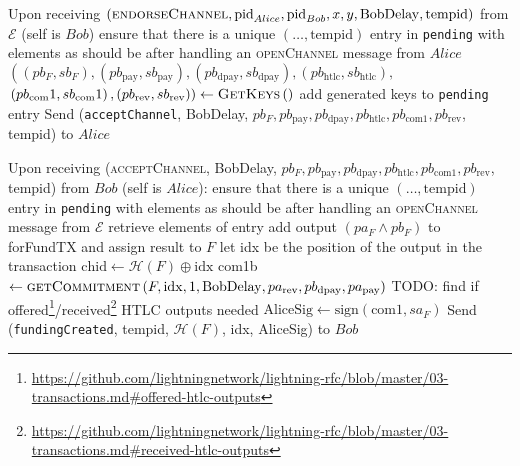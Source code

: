 \begin{algorithmic}[1]
    \State Upon receiving $\left(\textsc{endorseChannel}, \mathrm{pid}_{Alice},
    \mathrm{pid}_{Bob}, x, y, \mathrm{BobDelay}, \mathrm{tempid}\right)$ from
    $\mathcal{E}$ (self is $Bob$)
    \Indent
      \State ensure that there is a unique $\left(\dots, \mathrm{tempid}\right)$
      entry in \texttt{pending} with elements as should be after handling an
      \textsc{openChannel} message from $Alice$
      \State $\left(\left(pb_F, sb_F\right), \left(pb_\mathrm{pay},
      sb_\mathrm{pay}\right), \left(pb_\mathrm{dpay}, sb_\mathrm{dpay}\right),
      \left(pb_\mathrm{htlc}, sb_\mathrm{htlc}\right),\right.$
      \State $\left.\left(pb_\mathrm{com}1, sb_\mathrm{com}1\right),
      \left(pb_\mathrm{rev}, sb_\mathrm{rev}\right)\right) \gets
      \textsc{GetKeys}\left(\right)$
      \State add generated keys to \texttt{pending} entry
      \State Send (\texttt{acceptChannel}, BobDelay, $pb_F,
      pb_{\mathrm{pay}}, pb_{\mathrm{dpay}}, pb_{\mathrm{htlc}},
      pb_{\mathrm{com}1}, pb_{\mathrm{rev}}$, tempid) to $Alice$
    \EndIndent
    \State

    \State Upon receiving (\textsc{acceptChannel}, BobDelay, $pb_F,
    pb_{\mathrm{pay}}, pb_{\mathrm{dpay}}, pb_{\mathrm{htlc}},
    pb_{\mathrm{com}1}, pb_{\mathrm{rev}}$, tempid) from $Bob$ (self is
    $Alice$):
    \Indent
      \State ensure that there is a unique $\left(\dots, \mathrm{tempid}\right)$
      entry in \texttt{pending} with elements as should be after handling an
      \textsc{openChannel} message from $\mathcal{E}$
      \State retrieve elements of entry
      \State add output $\left(pa_F \wedge pb_F\right)$ to forFundTX and assign
      result to $F$
      \State let idx be the position of the output in the transaction
      \State $\mathrm{chid} \gets \mathcal{H}\left(F\right) \oplus \mathrm{idx}$
      \State com1b $\gets \textsc{getCommitment}\left(F, \mathrm{idx},
      1, \mathrm{BobDelay}, pa_{\mathrm{rev}}, pb_{\mathrm{dpay}},
      pa_{\mathrm{pay}}\right)$ TODO: find if
      offered\footnote{\url{https://github.com/lightningnetwork/lightning-rfc/blob/master/03-transactions.md\#offered-htlc-outputs}}/received\footnote{\url{https://github.com/lightningnetwork/lightning-rfc/blob/master/03-transactions.md\#received-htlc-outputs}}
      HTLC outputs needed
      \State $\mathrm{AliceSig} \gets \mathrm{sign}\left(\mathrm{com1},
      sa_F\right)$
      \State Send (\texttt{fundingCreated}, tempid, $\mathcal{H}\left(F\right)$,
      idx, AliceSig) to $Bob$
    \EndIndent
    \State


\end{algorithmic}
